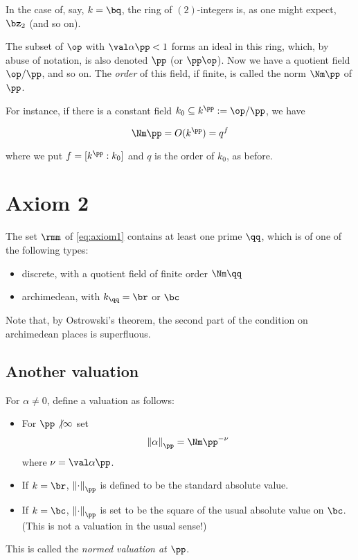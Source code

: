 \begin{example}
  In the case of, say, $k = \bq$, the ring of $(2)$-integers is, as one might
  expect, $\bz_2$ (and so on).
\end{example}
The subset of $\op$ with $\val\alpha\pp < 1$ forms an ideal in this ring, which,
by abuse of notation, is also denoted $\pp$ (or $\pp\op$). Now we have a
quotient field $\op/\pp$, and so on. The \emph{order} of this field, if finite,
is called the norm $\Nm\pp$ of $\pp$.

For instance, if there is a constant field $k_0 \subseteq k^{\pp} := \op/\pp$, we
have

\[ \Nm\pp = O(k^\pp) = q^f \]

where we put $f = {[k^\pp : k_0]}$ and $q$ is the order of $k_0$, as before.

\section{Axiom 2}
\label{sub:axiom2}
\begin{axiom}
  \label{eq:axiom2}
  The set $\rmm$ of \ref{eq:axiom1} contains at least one prime $\qq$, which is of
  one of the following types:
  \begin{itemize}
  \item discrete, with a quotient field of finite order $\Nm\qq$
  \item archimedean, with $k_\qq=\br$ or $\bc$
  \end{itemize}
\end{axiom}
Note that, by Ostrowski's theorem, the second part of the condition on
archimedean places is superfluous.

\subsection{Another valuation}
\label{sec:orgheadline21}
For $\alpha\neq 0$, define a valuation as follows:
\begin{itemize}
\item For $\pp \not | \infty$ set
  \[ { \left\lVert \alpha \right\rVert }_\pp = { \Nm\pp^{-\nu} } \]
  where $\nu = \val \alpha \pp$.
\item If $k=\br$, $\left\lVert \cdot \right\rVert_\pp$ is defined to be the standard absolute value.
\item If $k=\bc$, $\left\lVert \cdot \right\rVert_\pp$ is set to be the square of the usual absolute
  value on $\bc$. (This is not a valuation in the usual sense!)
\end{itemize}
This is called the \textit{normed valuation at $\pp$}.

